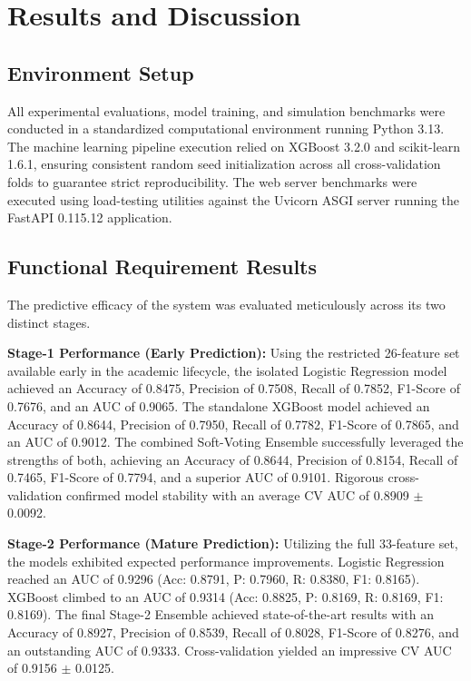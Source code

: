 \documentclass[12pt,a4paper]{report}
\begin{document}
\chapter{Results and Discussion}

\section{Environment Setup}
All experimental evaluations, model training, and simulation benchmarks were conducted in a standardized computational environment running Python 3.13. The machine learning pipeline execution relied on XGBoost 3.2.0 and scikit-learn 1.6.1, ensuring consistent random seed initialization across all cross-validation folds to guarantee strict reproducibility. The web server benchmarks were executed using load-testing utilities against the Uvicorn ASGI server running the FastAPI 0.115.12 application.

\section{Functional Requirement Results}
The predictive efficacy of the system was evaluated meticulously across its two distinct stages.

\textbf{Stage-1 Performance (Early Prediction):} Using the restricted 26-feature set available early in the academic lifecycle, the isolated Logistic Regression model achieved an Accuracy of 0.8475, Precision of 0.7508, Recall of 0.7852, F1-Score of 0.7676, and an AUC of 0.9065. The standalone XGBoost model achieved an Accuracy of 0.8644, Precision of 0.7950, Recall of 0.7782, F1-Score of 0.7865, and an AUC of 0.9012. The combined Soft-Voting Ensemble successfully leveraged the strengths of both, achieving an Accuracy of 0.8644, Precision of 0.8154, Recall of 0.7465, F1-Score of 0.7794, and a superior AUC of 0.9101. Rigorous cross-validation confirmed model stability with an average CV AUC of 0.8909 $\pm$ 0.0092.

\textbf{Stage-2 Performance (Mature Prediction):} Utilizing the full 33-feature set, the models exhibited expected performance improvements. Logistic Regression reached an AUC of 0.9296 (Acc: 0.8791, P: 0.7960, R: 0.8380, F1: 0.8165). XGBoost climbed to an AUC of 0.9314 (Acc: 0.8825, P: 0.8169, R: 0.8169, F1: 0.8169). The final Stage-2 Ensemble achieved state-of-the-art results with an Accuracy of 0.8927, Precision of 0.8539, Recall of 0.8028, F1-Score of 0.8276, and an outstanding AUC of 0.9333. Cross-validation yielded an impressive CV AUC of 0.9156 $\pm$ 0.0125.
\end{document}
